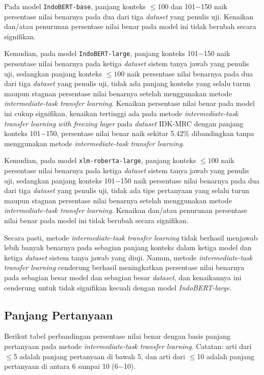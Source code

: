 Pada model \texttt{IndoBERT-base}, panjang konteks $\leq100$ dan 101$-$150 naik persentase nilai benarnya pada dua dari tiga \emph{dataset} yang penulis uji. Kenaikan dan/atau penurunan persentase nilai benar pada model ini tidak berubah secara signifikan.

Kemudian, pada model \texttt{IndoBERT-large}, panjang konteks 101$-$150 naik persentase nilai benarnya pada ketiga \emph{dataset} sistem tanya jawab yang penulis uji, sedangkan panjang konteks $\leq100$ naik persentase nilai benarnya pada dua dari tiga \emph{dataset} yang penulis uji, tidak ada panjang konteks yang selalu turun maupun stagnan persentase nilai benarnya setelah menggunakan metode \emph{intermediate-task transfer learning}. Kenaikan persentase nilai benar pada model ini cukup signifikan, kenaikan tertinggi ada pada metode \emph{intermediate-task transfer learning with freezing layer} pada \emph{dataset} IDK-MRC dengan panjang konteks 101$-$150, persentase nilai benar naik sekitar 5.42\% dibandingkan tanpa menggunakan metode \emph{intermediate-task transfer learning}.

Kemudian, pada model \texttt{xlm-roberta-large}, panjang konteks $\leq100$ naik persentase nilai benarnya pada ketiga \emph{dataset} sistem tanya jawab yang penulis uji, sedangkan panjang konteks 101$-$150 naik persentase nilai benarnya pada dua dari tiga \emph{dataset} yang penulis uji, tidak ada tipe pertanyaan yang selalu turun maupun stagnan persentase nilai benarnya setelah menggunakan metode \emph{intermediate-task transfer learning}. Kenaikan dan/atau penurunan persentase nilai benar pada model ini tidak berubah secara signifikan.

Secara pasti, metode \emph{intermediate-task transfer learning} tidak berhasil menjawab lebih banyak benarnya pada sebagian panjang konteks dalam ketiga model dan ketiga \emph{dataset} sistem tanya jawab yang diuji. Namun, metode \emph{intermediate-task transfer learning} cenderung berhasil meningkatkan persentase nilai benarnya pada sebagian besar model dan sebagian besar \emph{dataset}, dan kenaikannya ini cenderung untuk tidak signifikan kecuali dengan model \emph{IndoBERT-large}.

\subsection{Panjang Pertanyaan}
Berikut tabel perbandingan persentase nilai benar dengan basis panjang pertanyaan pada metode \emph{intermediate-task transfer learning}. Catatan: arti dari $\leq$5 adalah panjang pertanyaan di bawah 5, dan arti dari $\leq$10 adalah panjang pertanyaan di antara 6 sampai 10 (6$-$10).

